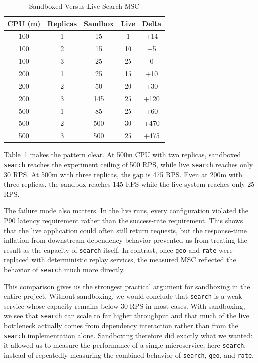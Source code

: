 \documentclass[conference]{IEEEtran}
\begin{document}
\begin{table}[t]
\caption{Sandboxed Versus Live Search MSC}
\label{tab:search-compare}
\centering
\begin{tabular}{ccccc}
\toprule
CPU (m) & Replicas & Sandbox & Live & Delta \\
\midrule
100 & 1 & 15 & 1 & +14 \\
100 & 2 & 15 & 10 & +5 \\
100 & 3 & 25 & 25 & 0 \\
200 & 1 & 25 & 15 & +10 \\
200 & 2 & 50 & 20 & +30 \\
200 & 3 & 145 & 25 & +120 \\
500 & 1 & 85 & 25 & +60 \\
500 & 2 & 500 & 30 & +470 \\
500 & 3 & 500 & 25 & +475 \\
\bottomrule
\end{tabular}
\end{table}

Table~\ref{tab:search-compare} makes the pattern clear. At 500m CPU with two replicas, sandboxed \texttt{search} reaches the experiment ceiling of 500 RPS, while live \texttt{search} reaches only 30 RPS. At 500m with three replicas, the gap is 475 RPS. Even at 200m with three replicas, the sandbox reaches 145 RPS while the live system reaches only 25 RPS.

The failure mode also matters. In the live runs, every configuration violated the P90 latency requirement rather than the success-rate requirement. This shows that the live application could often still return requests, but the response-time inflation from downstream dependency behavior prevented us from treating the result as the capacity of \texttt{search} itself. In contrast, once \texttt{geo} and \texttt{rate} were replaced with deterministic replay services, the measured MSC reflected the behavior of \texttt{search} much more directly.

This comparison gives us the strongest practical argument for sandboxing in the entire project. Without sandboxing, we would conclude that \texttt{search} is a weak service whose capacity remains below 30 RPS in most cases. With sandboxing, we see that \texttt{search} can scale to far higher throughput and that much of the live bottleneck actually comes from dependency interaction rather than from the \texttt{search} implementation alone. Sandboxing therefore did exactly what we wanted: it allowed us to measure the performance of a single microservice, here \texttt{search}, instead of repeatedly measuring the combined behavior of \texttt{search}, \texttt{geo}, and \texttt{rate}.
\end{document}
